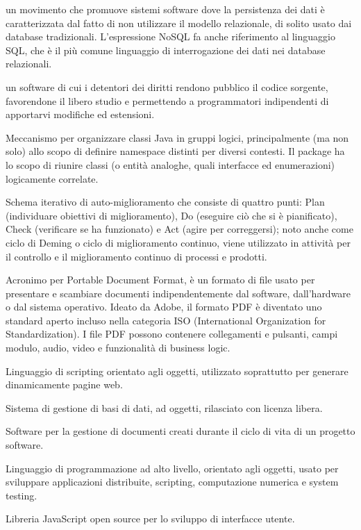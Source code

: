 \item[nosql] un movimento che promuove sistemi software dove la persistenza dei dati è caratterizzata dal fatto di non utilizzare il modello relazionale, di solito usato dai database tradizionali. L'espressione NoSQL fa anche riferimento al linguaggio SQL, che è il più comune linguaggio di interrogazione dei dati nei database relazionali.
\item[Open Source] un software di cui i detentori dei diritti rendono pubblico il codice sorgente, favorendone il libero studio e permettendo a programmatori indipendenti di apportarvi modifiche ed estensioni. 
\item[package] Meccanismo per organizzare classi Java in gruppi logici, principalmente (ma non solo) allo scopo di definire namespace distinti per diversi contesti. Il package ha lo scopo di riunire classi (o entità analoghe, quali interfacce ed enumerazioni) logicamente correlate.
\item[PDCA, schema] Schema iterativo di auto-miglioramento che consiste di quattro punti: Plan (individuare obiettivi di miglioramento), Do (eseguire ciò che si è pianificato), Check (verificare se ha funzionato) e Act (agire per correggersi); noto anche come ciclo di Deming o ciclo di miglioramento continuo, viene utilizzato in attività per il controllo e il miglioramento continuo di processi e prodotti.
\item[PDF] Acronimo per Portable Document Format, è un formato di file usato per presentare e scambiare documenti indipendentemente dal software, dall'hardware o dal sistema operativo. Ideato da Adobe, il formato PDF è diventato uno standard aperto incluso nella categoria ISO (International Organization for Standardization). I file PDF possono contenere collegamenti e pulsanti, campi modulo, audio, video e funzionalità di business logic.
\item[PHP] Linguaggio di scripting orientato agli oggetti, utilizzato soprattutto per generare dinamicamente pagine web.
\item[PostgreSQL] Sistema di gestione di basi di dati, ad oggetti, rilasciato con licenza libera.
\item[PragmaDB] Software per la gestione di documenti creati durante il ciclo di vita di un progetto software.
\item[Python] Linguaggio di programmazione ad alto livello, orientato agli oggetti, usato per sviluppare applicazioni distribuite, scripting, computazione numerica e system testing.
\item[React.js] Libreria JavaScript open source per lo sviluppo di interfacce utente.
